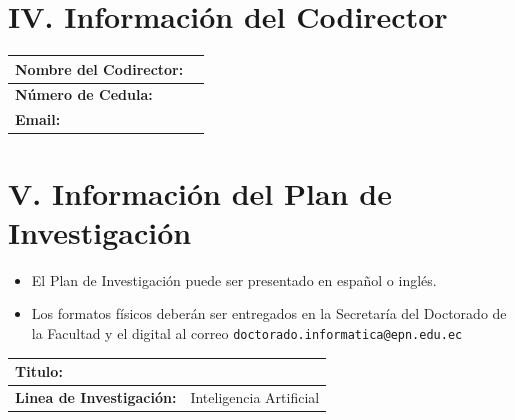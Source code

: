 \section*{IV. Información del Codirector}
\begin{longtable}{|p{}|p{}|}
	\hline
	\textbf{Nombre del Codirector:} & \\ \hline
	\textbf{Número de Cedula:}      & \\ \hline
	\textbf{Email:}                 & \\ \hline
\end{longtable}

\section*{V. Información del Plan de Investigación}

\begin{itemize}
	\item El Plan de Investigación puede ser presentado en español o inglés.
	\item Los formatos físicos deberán ser entregados en la Secretaría del Doctorado de la Facultad y el digital al correo \texttt{doctorado.informatica@epn.edu.ec}
\end{itemize}

\begin{longtable}{|p{}|p{}|}
	\hline
	\textbf{Titulo:}                 &                         \\ \hline
	\textbf{Linea de Investigación:} & Inteligencia Artificial \\ \hline
	
\end{longtable}
